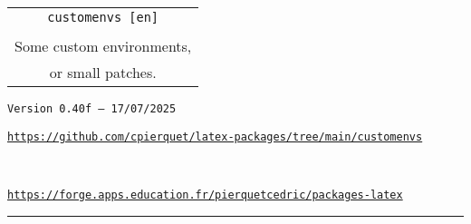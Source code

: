 \documentclass[english,11pt,a4paper]{article}
\def\TPversion{0.40f}
\def\TPdate{17/07/2025}
\begin{document}
\pagestyle{fancy}

\thispagestyle{empty}

\begin{center}
	\begin{minipage}{0.75\linewidth}
	\begin{tcolorbox}[colframe=yellow,colback=yellow!15]
		\begin{center}
			\renewcommand\arraystretch{1.25}
			\begin{tabular}{c}
				{\Huge \texttt{customenvs [en]}}\\
				\\
				{\Large Some custom environments,} \\
				{\Large or small patches.} \\
			\end{tabular}
			\renewcommand\arraystretch{1}
			
			\medskip
			
			{\small \texttt{Version \TPversion{} -- \TPdate}}
		\end{center}
	\end{tcolorbox}
\end{minipage}
\end{center}

\begin{center}
\begin{minipage}{0.85\linewidth}
	\begin{tcolorbox}[colframe=teal,colback=teal!10,halign=center,fontupper=\footnotesize]
		\texttt{\url{https://github.com/cpierquet/latex-packages/tree/main/customenvs}}
		
		~
		
		\texttt{\url{https://forge.apps.education.fr/pierquetcedric/packages-latex}}
	\end{tcolorbox}
\end{minipage}
\end{center}

\vspace*{5mm}

%
%
%
%
%

\hrule


\end{document}
